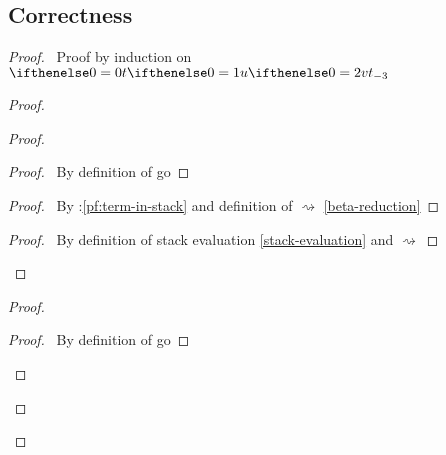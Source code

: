 \documentclass[a4paper]{article}
\begin{document}
\subsection{Correctness}
\begin{proof}
  \prove{$\stackapp \aStack {\subs \aTerm \env} \rightsquigarrow^* \go {\scoped \aTerm \env} \aStack \not\rightsquigarrow$}
  \pfsketch\ Proof by induction on $\aTerm$
  \begin{proof}
    \begin{proof}
      \begin{proof}
        \pf\ By definition of \textsf{go}
      \end{proof}
      \begin{proof}
        \pf\ By \toplevel:\ref{pf:term-in-stack} and definition of $\rightsquigarrow$ \ref{beta-reduction}
      \end{proof}
      \begin{proof}
        \pf\ By definition of stack evaluation \ref{stack-evaluation} and $\rightsquigarrow$
      \end{proof}
    \end{proof}
    \begin{proof}
      \begin{proof}
        \pf\ By definition of \textsf{go}
      \end{proof}

\end{proof}
\end{proof}
\end{proof}
\end{document}
